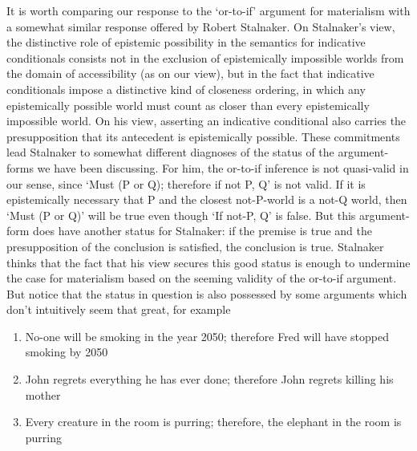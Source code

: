 It is worth comparing our response to the `or-to-if' argument for
materialism with a somewhat similar response offered by Robert
Stalnaker. On Stalnaker's view, the distinctive role of epistemic
possibility in the semantics for indicative conditionals consists not in
the exclusion of epistemically impossible worlds from the domain of
accessibility (as on our view), but in the fact that indicative
conditionals impose a distinctive kind of closeness ordering, in which
any epistemically possible world must count as closer than every
epistemically impossible world. On his view, asserting an indicative
conditional also carries the presupposition that its antecedent is
epistemically possible. These commitments lead Stalnaker to somewhat
different diagnoses of the status of the argument-forms we have been
discussing. For him, the or-to-if inference is not quasi-valid in our
sense, since `Must (P or Q); therefore if not P, Q' is not valid. If it
is epistemically necessary that P and the closest not-P-world is a not-Q
world, then `Must (P or Q)' will be true even though `If not-P, Q' is
false. But this argument-form does have another status for Stalnaker: if
the premise is true and the presupposition of the conclusion is
satisfied, the conclusion is true. Stalnaker thinks that the fact that
his view secures this good status is enough to undermine the case for
materialism based on the seeming validity of the or-to-if argument. But
notice that the status in question is also possessed by some arguments
which don't intuitively seem that great, for example

\begin{enumerate}
\def\labelenumi{(\arabic{enumi})}
\setcounter{enumi}{26}
\item
  No-one will be smoking in the year 2050; therefore Fred will have
  stopped smoking by 2050
\item
  John regrets everything he has ever done; therefore John regrets
  killing his mother
\item
  Every creature in the room is purring; therefore, the elephant in the
  room is purring
\end{enumerate}

